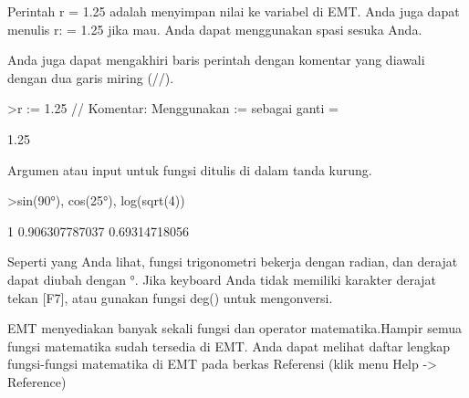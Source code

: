 \documentclass[a4paper,10pt]{article}
\begin{document}
\begin{eulernotebook}
\begin{eulercomment}
\begin{eulercomment}
\begin{eulercomment}
\begin{eulercomment}
\begin{eulercomment}
Perintah r = 1.25 adalah menyimpan nilai ke variabel di EMT. Anda juga
dapat menulis r: = 1.25 jika mau. Anda dapat menggunakan spasi sesuka
Anda.

Anda juga dapat mengakhiri baris perintah dengan komentar yang diawali
dengan dua garis miring (//).
\end{eulercomment}
\begin{eulerprompt}
>r := 1.25 // Komentar: Menggunakan  := sebagai ganti =
\end{eulerprompt}
\begin{euleroutput}
  1.25
\end{euleroutput}
\begin{eulercomment}
Argumen atau input untuk fungsi ditulis di dalam tanda kurung.
\end{eulercomment}
\begin{eulerprompt}
>sin(90°), cos(25°), log(sqrt(4))
\end{eulerprompt}
\begin{euleroutput}
  1
  0.906307787037
  0.69314718056
\end{euleroutput}
\begin{eulercomment}
Seperti yang Anda lihat, fungsi trigonometri bekerja dengan radian, dan derajat
dapat diubah dengan °. Jika keyboard Anda tidak memiliki karakter derajat tekan
[F7], atau gunakan fungsi deg() untuk mengonversi.

EMT menyediakan banyak sekali fungsi dan operator matematika.Hampir semua fungsi
matematika sudah tersedia di EMT. Anda dapat melihat daftar lengkap fungsi-fungsi
matematika di EMT pada berkas Referensi (klik menu Help -\textgreater{} Reference)


\end{eulercomment}
\end{eulercomment}
\end{eulercomment}
\end{eulercomment}
\end{eulercomment}
\end{eulernotebook}
\end{document}
